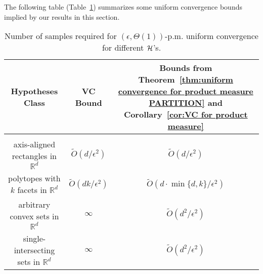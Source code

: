 The following table (Table~\ref{tab:productVC}) summarizes some uniform convergence bounds implied by our results in this section.


\begin{table}[h]
	\centering
		\begin{tabular}{c || c | c}
			
			\hline\hline
			Hypotheses Class & \begin{minipage}[h]{4cm}\centering VC Bound\end{minipage} & \begin{minipage}[h]{7cm}\centering  Bounds from Theorem~\ref{thm:uniform convergence for product measure PARTITION} and Corollary~\ref{cor:VC for product measure}\end{minipage}\\
			\hline
			& &\\
			 axis-aligned rectangles in $\mathbb{R}^d$ &  $\tilde{O}(d /\epsilon^2)$ & $\tilde{O}(d /\epsilon^2)$	\\		
			polytopes with $k$ facets in $\mathbb{R}^d$ &  $\tilde{O}(d k /\epsilon^2)$ & $\tilde{O}(d \cdot \min\{d,k\} /\epsilon^2)$\\
			arbitrary convex sets in $\mathbb{R}^d$ & $\infty$ & $\tilde{O}(d^2 /\epsilon^2)$\\
			single-intersecting sets in $\mathbb{R}^d$ & $\infty$ & $\tilde{O}(d^2 /\epsilon^2)$
		\end{tabular}
	\caption{Number of samples required for $(\epsilon,\Theta(1))$-p.m. uniform convergence for different ${\cal H}$'s.}
	\label{tab:productVC}
\end{table}